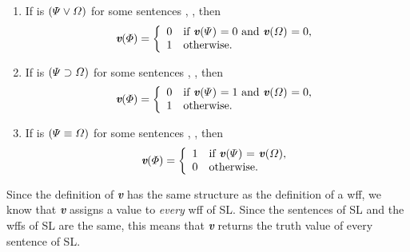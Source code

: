 {{%
\begin{enumerate}

\item If \metaA{} is $(\varPsi{}\vee\varOmega{})$ for some sentences \metaB{}, \metaC{}, then
\begin{displaymath}\textit{\textbf{v}}(\varPhi{}) =
	\left\{\begin{array}{ll}
	0 & \mbox{if \textit{\textbf{v}}(\ensuremath{\varPsi}{}) $= 0$ and \textit{\textbf{v}}(\ensuremath{\varOmega}{}) $= 0$,}\\
	1 & \mbox{otherwise.}
	\end{array}\right.
\end{displaymath}

\item If \metaA{} is $(\varPsi{}\supset\varOmega{})$ for some sentences \metaB{}, \metaC{}, then
\begin{displaymath}\textit{\textbf{v}}(\varPhi{}) =
	\left\{\begin{array}{ll}
	0 & \mbox{if \textit{\textbf{v}}(\ensuremath{\varPsi}{}) $= 1$ and \textit{\textbf{v}}(\ensuremath{\varOmega}{}) $= 0$,}\\
	1 & \mbox{otherwise.}
	\end{array}\right.
\end{displaymath}

\item If \metaA{} is $(\varPsi{}\equiv\varOmega{})$ for some sentences \metaB{}, \metaC{}, then
\begin{displaymath}\textit{\textbf{v}}(\varPhi{}) =
	\left\{\begin{array}{ll}
	1 & \mbox{if \textit{\textbf{v}}(\ensuremath{\varPsi}{}) $=$ \textit{\textbf{v}}(\ensuremath{\varOmega}{})},\\
	0 & \mbox{otherwise.}
	\end{array}\right.
\end{displaymath}
\end{enumerate}

Since the definition of \textit{\textbf{v}} has the same structure as the definition of a wff, we know that \textit{\textbf{v}} assigns a value to \emph{every} wff of SL. Since the sentences of SL and the wffs of SL are the same, this means that \textit{\textbf{v}} returns the truth value of every sentence of SL.

}}

